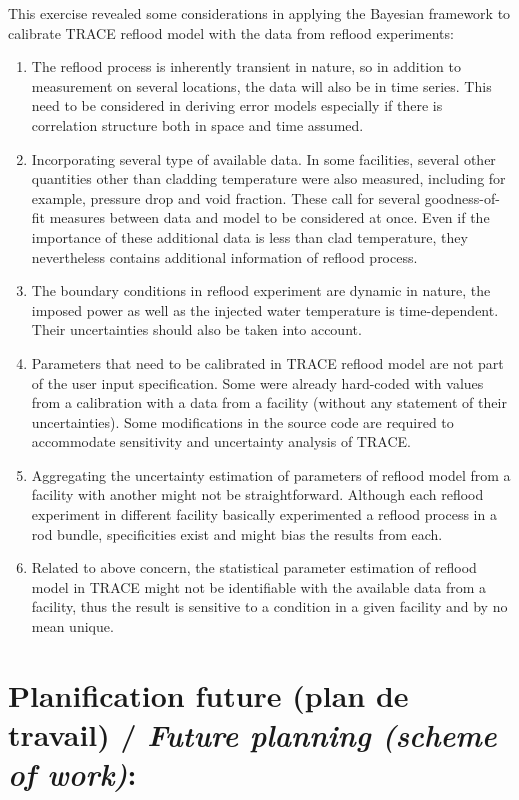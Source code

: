 \documentclass[11pt,titlepage]{article}
\begin{document}
This exercise revealed some considerations in applying the Bayesian framework to calibrate TRACE reflood model with the data from reflood experiments:
\begin{enumerate}
	\item The reflood process is inherently transient in nature, so in addition to measurement on several locations, the data will also be in time series. This need to be considered in deriving error models especially if there is correlation structure both in space and time assumed.
	\item Incorporating several type of available data. In some facilities, several other quantities other than cladding temperature were also measured, including for example, pressure drop and void fraction. These call for several goodness-of-fit measures between data and model to be considered at once. Even if the importance of these additional data is less than clad temperature, they nevertheless contains additional information of reflood process.
	\item The boundary conditions in reflood experiment are dynamic in nature, the imposed power as well as the injected water temperature is time-dependent. Their uncertainties should also be taken into account.
	\item Parameters that need to be calibrated in TRACE reflood model are not part of the user input specification. Some were already hard-coded with values from a calibration with a data from a facility (without any statement of their uncertainties). Some modifications in the source code are required to accommodate sensitivity and uncertainty analysis of TRACE.
	\item Aggregating the uncertainty estimation of parameters of reflood model from a facility with another might not be straightforward. Although each reflood experiment in different facility basically experimented a reflood process in a rod bundle, specificities exist and might bias the results from each.
	\item Related to above concern, the statistical parameter estimation of reflood model in TRACE might not be identifiable with the available data from a facility, thus the result is sensitive to a condition in a given facility and by no mean unique.
\end{enumerate}

\newpage
\section{Planification future (plan de travail) /  {\large\textit{Future planning (scheme of work)}}:}
\end{document}
